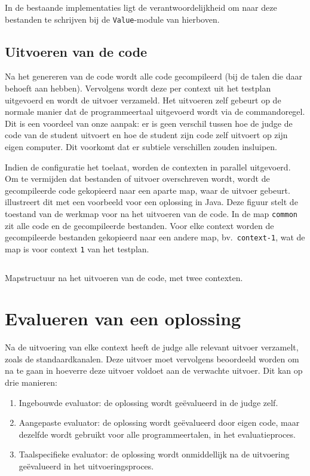 In de bestaande implementaties ligt de verantwoordelijkheid om naar deze bestanden te schrijven bij de \texttt{Value}-module van hierboven.

\subsection{Uitvoeren van de code}\label{subsec:uitvoeren-van-de-code}

Na het genereren van de code wordt alle code gecompileerd (bij de talen die daar behoeft aan hebben).
Vervolgens wordt deze per context uit het testplan uitgevoerd en wordt de uitvoer verzameld.
Het uitvoeren zelf gebeurt op de normale manier dat de programmeertaal uitgevoerd wordt via de commandoregel.
Dit is een voordeel van onze aanpak: er is geen verschil tussen hoe de judge de code van de student uitvoert en hoe de student zijn code zelf uitvoert op zijn eigen computer.
Dit voorkomt dat er subtiele verschillen zouden insluipen.

Indien de configuratie het toelaat, worden de contexten in parallel uitgevoerd.
Om te vermijden dat bestanden of uitvoer overschreven wordt, wordt de gecompileerde code gekopieerd naar een aparte map, waar de uitvoer gebeurt.
 illustreert dit met een voorbeeld voor een oplossing in Java.
Deze figuur stelt de toestand van de werkmap voor na het uitvoeren van de code.
In de map \texttt{common} zit alle code en de gecompileerde bestanden.
Voor elke context worden de gecompileerde bestanden gekopieerd naar een andere map, bv.\ \texttt{context-1}, wat de map is voor context \texttt{1} van het testplan.

\begin{listing}
    \inputminted{text}{code/dir-listing.txt}
    \caption{Mapstructuur na het uitvoeren van de code, met twee contexten.}
    \label{lst:mapstructuur}
\end{listing}

\section{Evalueren van een oplossing}\label{sec:evalueren-van-een-oplossing2}

Na de uitvoering van elke context heeft de judge alle relevant uitvoer verzamelt, zoals de standaardkanalen.
Deze uitvoer moet vervolgens beoordeeld worden om na te gaan in hoeverre deze uitvoer voldoet aan de verwachte uitvoer.
Dit kan op drie manieren:
\begin{enumerate}
    \item Ingebouwde evaluator: de oplossing wordt geëvalueerd in de judge zelf.
    \item Aangepaste evaluator: de oplossing wordt geëvalueerd door eigen code, maar dezelfde wordt gebruikt voor alle programmeertalen, in het evaluatieproces.
    \item Taalspecifieke evaluator: de oplossing wordt onmiddellijk na de uitvoering geëvalueerd in het uitvoeringsproces.
\end{enumerate}

